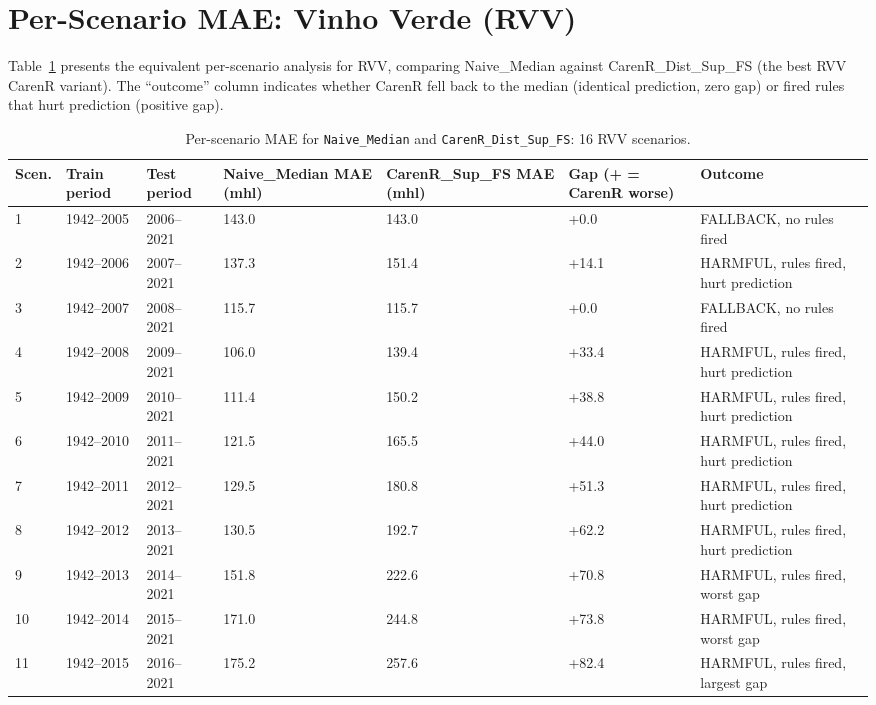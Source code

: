 \section{Per-Scenario MAE: Vinho Verde (RVV)}\label{sec:perscenario_mae_vinho_verde}

Table~\ref{tab:ch5b_2} presents the equivalent per-scenario analysis for RVV, comparing Naive\_Median against CarenR\_Dist\_Sup\_FS (the best RVV CarenR variant). The ``outcome'' column indicates whether CarenR fell back to the median (identical prediction, zero gap) or fired rules that hurt prediction (positive gap).

\begin{table}[htbp]
  \centering
  \caption{Per-scenario MAE for \texttt{Naive\_Median} and \texttt{CarenR\_Dist\_Sup\_FS}: 16 RVV scenarios.}\label{tab:ch5b_2}
  \small
  \begin{adjustbox}{max width=\textwidth}
    \begin{tabularx}{\textwidth}{p{0.7cm}|p{1.6cm}|p{1.6cm}|p{1.5cm}|p{1.5cm}|p{1.6cm}|X}
  \toprule
  Scen. & Train period & Test period & Naive\_Median
MAE (mhl) & CarenR\_Sup\_FS
MAE (mhl) & Gap
(+ = CarenR worse) & Outcome \\
  \midrule
  1 & 1942--2005 & 2006--2021 & 143.0 & 143.0 & +0.0 & FALLBACK, no rules fired \\
  2 & 1942--2006 & 2007--2021 & 137.3 & 151.4 & +14.1 & HARMFUL, rules fired, hurt prediction \\
  3 & 1942--2007 & 2008--2021 & 115.7 & 115.7 & +0.0 & FALLBACK, no rules fired \\
  4 & 1942--2008 & 2009--2021 & 106.0 & 139.4 & +33.4 & HARMFUL, rules fired, hurt prediction \\
  5 & 1942--2009 & 2010--2021 & 111.4 & 150.2 & +38.8 & HARMFUL, rules fired, hurt prediction \\
  6 & 1942--2010 & 2011--2021 & 121.5 & 165.5 & +44.0 & HARMFUL, rules fired, hurt prediction \\
  7 & 1942--2011 & 2012--2021 & 129.5 & 180.8 & +51.3 & HARMFUL, rules fired, hurt prediction \\
  8 & 1942--2012 & 2013--2021 & 130.5 & 192.7 & +62.2 & HARMFUL, rules fired, hurt prediction \\
  9 & 1942--2013 & 2014--2021 & 151.8 & 222.6 & +70.8 & HARMFUL, rules fired, worst gap \\
  10 & 1942--2014 & 2015--2021 & 171.0 & 244.8 & +73.8 & HARMFUL, rules fired, worst gap \\
  11 & 1942--2015 & 2016--2021 & 175.2 & 257.6 & +82.4 & HARMFUL, rules fired, largest gap \\

\end{tabularx}
\end{adjustbox}
\end{table}
